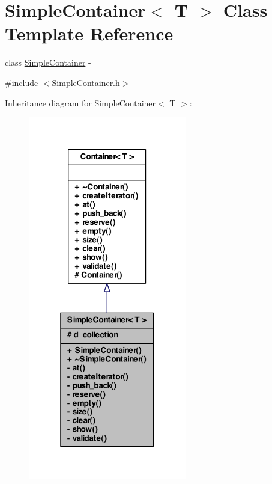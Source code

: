 \hypertarget{class_simple_container}{
\section{SimpleContainer$<$ T $>$ Class Template Reference}
\label{class_simple_container}
}


class \hyperlink{class_simple_container}{SimpleContainer} -\/  




{\ttfamily \#include $<$SimpleContainer.h$>$}



Inheritance diagram for SimpleContainer$<$ T $>$:\nopagebreak
\begin{figure}[H]
\begin{center}
\leavevmode
\includegraphics[width=196pt]{class_simple_container__inherit__graph}
\end{center}
\end{figure}



